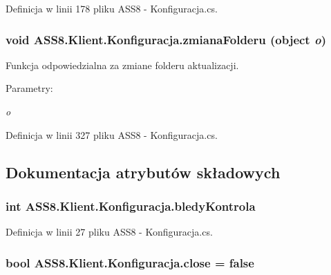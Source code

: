 Definicja w linii 178 pliku ASS8 - Konfiguracja.cs.\hypertarget{a00014_9d2b40a270afe4ddbcc6059e2e6d940b}{
\subsubsection[{zmianaFolderu}]{\setlength{\rightskip}{0pt plus 5cm}void ASS8.Klient.Konfiguracja.zmianaFolderu (object {\em o})}}
\label{d2/de7/a00014_9d2b40a270afe4ddbcc6059e2e6d940b}


Funkcja odpowiedzialna za zmiane folderu aktualizacji. 

\begin{Desc}
\item[Parametry:]
\begin{description}
\item[{\em o}]\end{description}
\end{Desc}


Definicja w linii 327 pliku ASS8 - Konfiguracja.cs.

\subsection{Dokumentacja atrybutów składowych}
\hypertarget{a00014_3817bb57be51df140314a2da2aa5ba7e}{
\subsubsection[{bledyKontrola}]{\setlength{\rightskip}{0pt plus 5cm}int {\bf ASS8.Klient.Konfiguracja.bledyKontrola}}}
\label{d2/de7/a00014_3817bb57be51df140314a2da2aa5ba7e}




Definicja w linii 27 pliku ASS8 - Konfiguracja.cs.\hypertarget{a00014_38ea713cadc6819701e3313479fbd000}{
\subsubsection[{close}]{\setlength{\rightskip}{0pt plus 5cm}bool {\bf ASS8.Klient.Konfiguracja.close} = false}}
\label{d2/de7/a00014_38ea713cadc6819701e3313479fbd000}




